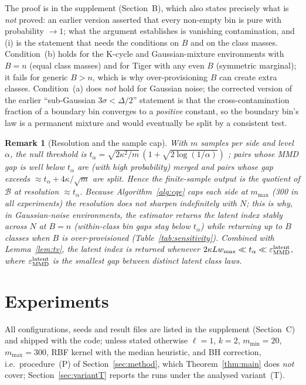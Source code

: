\documentclass[10pt]{article}
\newtheorem{remark}{Remark}
\newcommand{\calB}{\mathcal{B}}
\newcommand{\epsMMD}{\varepsilon_{\mathrm{MMD}}}
\begin{document}
The proof is in the supplement (Section~B), which also states precisely what is
\emph{not} proved: an earlier version asserted that every non-empty bin is pure
with probability $\to1$; what the argument establishes is vanishing
contamination, and (i) is the statement that needs the conditions on $B$ and on
the class masses.  Condition~(b) holds for the
K-cycle and Gaussian-mixture environments with $B=n$ (equal class masses) and
for Tiger with any even $B$ (symmetric marginal); it fails for generic
$B>n$, which is why over-provisioning $B$ can create extra classes.
Condition~(a) does \emph{not} hold for Gaussian noise; the corrected version
of the earlier ``sub-Gaussian $3\sigma<\Delta/2$'' statement is that the
cross-contamination fraction of a boundary bin converges to a \emph{positive}
constant, so the boundary bin's law is a permanent mixture and would eventually
be split by a consistent test.

\begin{remark}[Resolution and the sample cap]
\label{rem:resolution}
With $m$ samples per side and level $\alpha$, the null threshold is
$t_\alpha=\sqrt{2\kappa^2/m}\,(1+\sqrt{2\log(1/\alpha)})$ \citep[Cor.~9]{Gretton2012};
pairs whose MMD gap is well below $t_\alpha$ are (with high probability)
merged and pairs whose gap exceeds $\approx t_\alpha+4\kappa/\sqrt m$ are split.
Hence the finite-sample output is the quotient of $\calB$ at resolution
$\approx t_\alpha$.  Because Algorithm~\ref{alg:cqe} caps each side at
$m_{\max}$ (300 in all experiments) the resolution does \emph{not} sharpen
indefinitely with $N$; this is why, in Gaussian-noise environments, the
estimator returns the latent index stably across $N$ at $B=n$
(within-class bin gaps stay below $t_\alpha$) while returning up to $B$
classes when $B$ is over-provisioned (Table~\ref{tab:sensitivity}).
Combined with Lemma~\ref{lem:tv}, the latent index is returned whenever
$2\kappa Lw_{\max}\ll t_\alpha\ll\epsMMD^{\rm latent}$, where
$\epsMMD^{\rm latent}$ is the smallest gap between distinct latent class laws.
\end{remark}

\section{Experiments}
\label{sec:experiments}

All configurations, seeds and result files are listed in the supplement
(Section~C) and shipped with the code; unless stated otherwise
$\ell=1$, $k=2$, $m_{\min}=20$, $m_{\max}=300$, RBF kernel with the median
heuristic, and BH correction, i.e.\ procedure~(P) of Section~\ref{sec:method}, which
Theorem~\ref{thm:main} does \emph{not} cover; Section~\ref{sec:variantT} reports
the runs under the analysed variant~(T).
\end{document}
